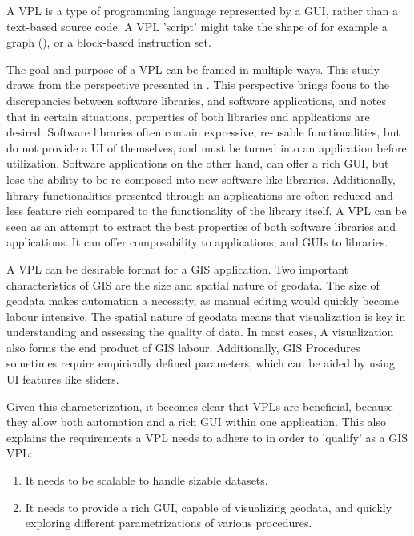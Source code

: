 A \ac{VPL} is a type of programming language represented by a \ac{GUI}, rather than a text-based source code.
A \ac{VPL} 'script' might take the shape of for example a graph (), or a block-based instruction set.

The goal and purpose of a VPL can be framed in multiple ways. 
This study draws from the perspective presented in \citep*{elliott_tangible_2007}.
This perspective brings focus to the discrepancies between software libraries, and software applications, and notes that in certain situations, properties of both libraries and applications are desired. 
Software libraries often contain expressive, re-usable functionalities, but do not provide a \ac{UI} of themselves, and must be turned into an application before utilization.
Software applications on the other hand, can offer a rich \ac{GUI}, but lose the ability to be re-composed into new software like libraries. Additionally, library functionalities presented through an applications are often reduced and less feature rich compared to the functionality of the library itself.
A VPL can be seen as an attempt to extract the best properties of both software libraries and applications. 
It can offer composability to applications, and \ac{GUI}s to libraries.
 
A VPL can be desirable format for a \ac{GIS} application.
Two important characteristics of \ac{GIS} are the size and spatial nature of geodata.
The size of geodata makes automation a necessity, as manual editing would quickly become labour intensive.
The spatial nature of geodata means that visualization is key in understanding and assessing the quality of data. 
In most cases, A visualization also forms the end product of \ac{GIS} labour.
Additionally, \ac{GIS} Procedures sometimes require empirically defined parameters, which can be aided by using UI features like sliders. 

Given this characterization, it becomes clear that \ac{VPL}s are beneficial, because they allow both automation and a rich \ac{GUI} within one application. 
This also explains the requirements a VPL needs to adhere to in order to 'qualify' as a \ac{GIS} \ac{VPL}:
\begin{enumerate}
  \item It needs to be scalable to handle sizable datasets.
  \item It needs to provide a rich \ac{GUI}, capable of visualizing geodata, and quickly exploring different parametrizations of various procedures.
\end{enumerate}


